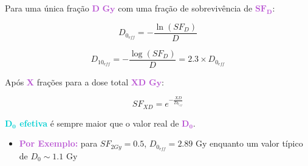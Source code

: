 \documentclass[11pt,a4paper]{article}
\begin{document}
	Para uma única fração \textcolor{MediumOrchid}{$\mathbf{D \text{ Gy}}$}  com uma fração de sobrevivência de \textcolor{MediumOrchid}{$\mathbf{SF_D}$}:

	\begin{equation}
		D_{0_{eff}} = - \frac{\ln \left(SF_D\right)}{D}
	\end{equation}

	\begin{equation}
		D_{10_{eff}} = - \frac{\log \left(SF_D\right)}{D} = 2.3 \times D_{0_{eff}}
	\end{equation}

	Após \textcolor{MediumOrchid}{\textbf{X}} frações para a dose total \textcolor{MediumOrchid}{$\mathbf{XD \text{ Gy}}$}:

	\begin{equation}
		SF_{XD} = e^{-\frac{XD}{D_{0_{eff}}}}
	\end{equation}

	\textcolor{DarkTurquoise}{\textbf{$\mathbf{D_0}$ efetiva}} é sempre maior que o valor real de \textcolor{MediumOrchid}{$\mathbf{D_0}$}.

	\begin{itemize}[label=\textcolor{CarnationPink}{$\blacktriangleright$}]
		\item \textcolor{MediumOrchid}{\LobsterTwo\textbf{Por Exemplo:}} para $SF_{2Gy} = 0.5$, $D_{0_{eff}} = 2.89 \text{ Gy}$ enquanto um valor típico de $D_0 \sim 1.1 \text{ Gy}$
	\end{itemize}
\end{document}
